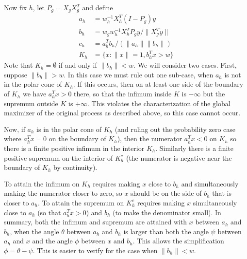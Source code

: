 \documentclass{imsart}
\newcommand{\norm}[1]{\lVert #1 \rVert}
\begin{document}
Now fix $h$, let $P_g = X_gX_g^T$ and define
\begin{align*}
a_h &= w_h^{-1} X_h^T (I-P_g) y \\
b_h &= w_g w_h^{-1} X_h^T P_g y / \norm{X_g^T y} \\
c_h &= a_h^T b_h / (\norm{a_h} \norm{b_h}) \\
K_h   &= \{ x : \norm{x} = 1, b_h^Tx > w \}
\end{align*}
Note that $K_h = \emptyset$ if and only if $\norm{b_h} < w$. We will consider two cases. First, suppose $\norm{b_h} > w$. In this case we must rule out one sub-case, when $a_h$ is not in the polar cone of $K_h$. If this occurs, then on at least one side of the boundary of $K_h$ we have $a_h^Tx > 0$ there, so that the infimum inside $K$ is $-\infty$ but the supremum outside $K$ is $+\infty$. This violates the characterization of the global maximizer of the original process as described above, so this case cannot occur.

Now, if $a_h$ is in the polar cone of $K_h$ (and ruling out the probability zero case where $a_h^Tx = 0$ on the boundary of $K_h$), then the numerator $a_h^Tx < 0$ on $K_h$ so there is a finite positive infimum in the interior $K_h$. Similarly there is a finite positive supremum on the interior of $K_h^c$ (the numerator is negative near the boundary of $K_h$ by continuity).

To attain the infimum on $K_h$ requires making $x$ close to $b_h$ and simultaneously making the numerator closer to zero, so $x$ should be on the side of $b_h$ that is closer to $a_h$. To attain the supremum on $K_h^c$ requires making $x$ simultaneously close to $a_h$ (so that $a_h^Tx > 0$) and $b_h$ (to make the denominator small). In summary, both the infimum and supremum are attained with $x$ between $a_h$ and $b_h$, when the angle $\theta$ between $a_h$ and $b_h$ is larger than both the angle $\psi$ between $a_h$ and $x$ and the angle $\phi$ between $x$ and $b_h$. This allows the simplification $\phi = \theta - \psi$. This is easier to verify for the case when $\norm{b_h} < w$.
\end{document}
